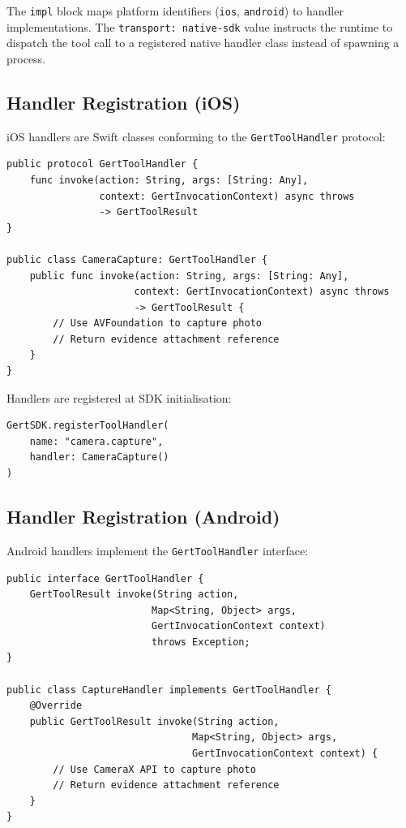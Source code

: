 The \texttt{impl} block maps platform identifiers (\texttt{ios}, \texttt{android}) to handler implementations. The \texttt{transport: native-sdk} value instructs the runtime to dispatch the tool call to a registered native handler class instead of spawning a process.

\subsection{Handler Registration (iOS)}

iOS handlers are Swift classes conforming to the \texttt{GertToolHandler} protocol:

\begin{verbatim}
public protocol GertToolHandler {
    func invoke(action: String, args: [String: Any], 
                context: GertInvocationContext) async throws 
                -> GertToolResult
}

public class CameraCapture: GertToolHandler {
    public func invoke(action: String, args: [String: Any], 
                      context: GertInvocationContext) async throws 
                      -> GertToolResult {
        // Use AVFoundation to capture photo
        // Return evidence attachment reference
    }
}
\end{verbatim}

Handlers are registered at SDK initialisation:

\begin{verbatim}
GertSDK.registerToolHandler(
    name: "camera.capture",
    handler: CameraCapture()
)
\end{verbatim}

\subsection{Handler Registration (Android)}

Android handlers implement the \texttt{GertToolHandler} interface:

\begin{verbatim}
public interface GertToolHandler {
    GertToolResult invoke(String action, 
                         Map<String, Object> args,
                         GertInvocationContext context) 
                         throws Exception;
}

public class CaptureHandler implements GertToolHandler {
    @Override
    public GertToolResult invoke(String action, 
                                Map<String, Object> args,
                                GertInvocationContext context) {
        // Use CameraX API to capture photo
        // Return evidence attachment reference
    }
}
\end{verbatim}

